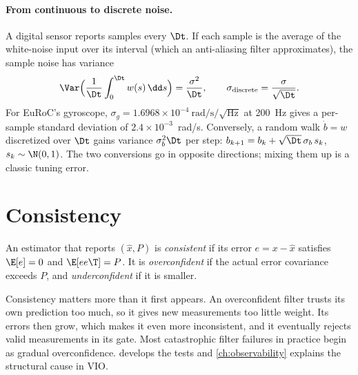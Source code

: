 \paragraph{From continuous to discrete noise.} A digital sensor reports samples every $\Dt$. If each
sample is the average of the white-noise input over its interval (which an anti-aliasing filter
approximates), the sample noise has variance
\begin{equation}
  \Var\Big(\frac1\Dt\int_0^\Dt w(s)\,\dd s\Big) = \frac{\sigma^2}{\Dt},
  \qquad \sigma_{\mathrm{discrete}} = \frac{\sigma}{\sqrt{\Dt}}.
  \label{eq:discrete-noise}
\end{equation}
For EuRoC's gyroscope, $\sigma_g = 1.6968\times10^{-4}~\mathrm{rad/s/\sqrt{Hz}}$ at 200~Hz gives a
per-sample standard deviation of $2.4\times10^{-3}$~rad/s. Conversely, a random walk
$\dot b = w$ discretized over $\Dt$ gains variance $\sigma_b^2\Dt$ per step:
$b_{k+1} = b_k + \sqrt{\Dt}\,\sigma_b\, s_k$, $s_k \sim \N(0,1)$. The two conversions go in opposite
directions; mixing them up is a classic tuning error.

\section{Consistency}

\begin{definition}
An estimator that reports $(\hat x, P)$ is \emph{consistent} if its error $e = x - \hat x$ satisfies
$\E[e] = 0$ and $\E[ee\T] = P$. It is \emph{overconfident} if the actual error covariance exceeds
$P$, and \emph{underconfident} if it is smaller.
\end{definition}

Consistency matters more than it first appears. An overconfident filter trusts its own prediction
too much, so it gives new measurements too little weight. Its errors then grow, which makes it
even more inconsistent, and it eventually rejects valid measurements in its gate. Most catastrophic
filter failures in practice begin as gradual overconfidence.  develops the
tests and \cref{ch:observability} explains the structural cause in VIO.


